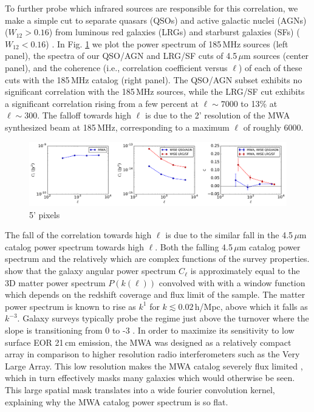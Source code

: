 \documentclass[preprint]{aastex}
\begin{document}
To further probe which infrared sources are responsible for this correlation, we make a simple cut to separate quasars (QSOs) and active galactic nuclei (AGNs) ($W_{12}>0.16$) from luminous red galaxies (LRGs) and starburst galaxies (SFs) ($W_{12}<0.16$) \citep{nikutta14,kurcz16}. In Fig. \ref{fig:wisexspec} we plot the power spectrum of 185\,MHz sources (left panel), the spectra of our QSO/AGN and LRG/SF cuts of 4.5\,$\mu$m sources (center panel), and the coherence (i.e., correlation coefficient versus $\ell$) of each of these cuts with the 185\,MHz catalog (right panel). The QSO/AGN subset exhibits no significant correlation with the 185\,MHz sources, while the LRG/SF cut exhibits a significant correlation rising from a few percent at $\ell\sim7000$ to 13\% at $\ell\sim300$. The falloff towards high $\ell$ is due to the 2' resolution of the MWA synthesized beam at 185\,MHz, corresponding to a maximum $\ell$ of roughly 6000. 

\begin{figure}[h]
\centering
\includegraphics[width=7in]{images/mwa_wise_qsoagn_gal_xspec.pdf}
\caption{5' pixels}
\label{fig:wisexspec}
\end{figure}


The fall of the correlation towards high $\ell$ is due to the similar fall in the 4.5\,$\mu$m catalog power spectrum towards high $\ell$. Both the falling 4.5\,$\mu$m catalog power spectrum and the relatively  which are complex functions of the survey properties. \citet{tegmark02,dodelson02} show that the galaxy angular power spectrum $C_\ell$ is approximately equal to the 3D matter power spectrum $P(k(\ell))$ convolved with with a window function which depends on the redshift coverage and flux limit of the sample. The matter power spectrum is known to rise as $k^{1}$ for $k\lesssim0.02$\,h/Mpc, above which it falls as $k^{-3}$. Galaxy surveys typically probe the regime just above the turnover where the slope is transitioning from 0 to -3 \citep{tegmark02b}. In order to maximize its sensitivity to low surface EOR 21\,cm emission, the MWA was designed as a relatively compact array in comparison to higher resolution radio interferometers such as the Very Large Array. This low resolution makes the MWA catalog severely flux limited \citep{PattiCatalog1}, which in turn effectively masks many galaxies which would otherwise be seen. This large spatial mask translates into a wide fourier convolution kernel, explaining why the MWA catalog power spectrum is so flat.
\end{document}
